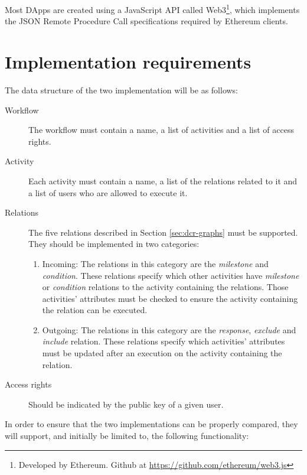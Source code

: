 \documentclass{article}
\begin{document}
		Most DApps are created using a JavaScript API called Web3\footnote{Developed by Ethereum. Github at \url{https://github.com/ethereum/web3.js}}, which implements the JSON Remote Procedure Call specifications required by Ethereum clients. 

	\section{Implementation requirements}
	\label{sec:implementation-requirements}
	The data structure of the two implementation will be as follows:

	\begin{description}
		\item[Workflow] The workflow must contain a name, a list of activities and a list of access rights.
		\item[Activity] Each activity must contain a name, a list of the relations related to it and a list of users who are allowed to execute it.
		\item[Relations] The five relations described in Section \ref{sec:dcr-graphs} must be supported. They should be implemented in two categories:
			\begin{enumerate}
				\item Incoming: The relations in this category are the \emph{milestone} and \emph{condition}. These relations specify which other activities have \emph{milestone} or \emph{condition} relations to the activity containing the relations. Those activities' attributes must be checked to ensure the activity containing the relation can be executed.
				\item Outgoing: The relations in this category are the \emph{response}, \emph{exclude} and \emph{include} relation. These relations specify which activities' attributes must be updated after an execution on the activity containing the relation. 
			\end{enumerate}
		\item[Access rights] Should be indicated by the public key of a given user.
	\end{description}

	In order to ensure that the two implementations can be properly compared, they will support, and initially be limited to, the following functionality: 
	
\end{document}
